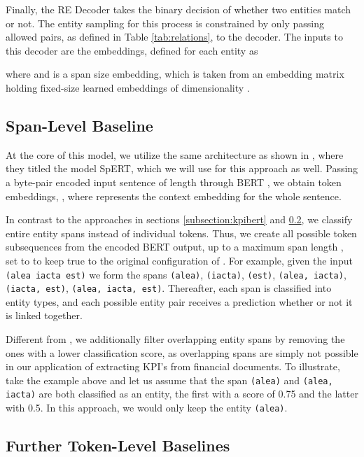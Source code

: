 \documentclass[conference, table]{IEEEtran}
\newcommand{\1} {\mathbbm{1}}
\begin{document}
Finally, the RE Decoder takes the binary decision of whether two entities match or not. The entity sampling for this process is constrained by only passing allowed pairs, as defined in Table \ref{tab:relations}, to the decoder. The inputs to this decoder are the embeddings, defined for each entity  as

where  and  is a span size embedding, which is taken from an embedding matrix  holding fixed-size learned embeddings of dimensionality .

\subsection{Span-Level Baseline}
\label{subsection:spert}

At the core of this model, we utilize the same architecture as shown in \cite{eberts2019span}, where they titled the model SpERT, which we will use for this approach as well. Passing a byte-pair encoded input sentence of length  through BERT \cite{devlin2018bert}, we obtain  token embeddings, , where  represents the context embedding for the whole sentence. 

In contrast to the approaches in sections \ref{subsection:kpibert} and \ref{subsection:furtherbaselines}, we classify entire entity spans instead of individual tokens. Thus, we create all possible token subsequences from the encoded BERT output, up to a maximum span length , set to  to keep true to the original configuration of \cite{eberts2019span}. For example, given the input \texttt{(alea iacta est)} we form the spans \texttt{(alea)}, \texttt{(iacta)}, \texttt{(est)}, \texttt{(alea, iacta)}, \texttt{(iacta, est)}, \texttt{(alea, iacta, est)}. Thereafter, each span is classified into entity types, and each possible entity pair receives a prediction whether or not it is linked together. 

Different from \cite{eberts2019span}, we additionally filter overlapping entity spans by removing the ones with a lower classification score, as overlapping spans are simply not possible in our application of extracting KPI's from financial documents. To illustrate, take the example above and let us assume that the span \texttt{(alea)} and \texttt{(alea, iacta)} are both classified as an entity, the first with a score of 0.75 and the latter with 0.5. In this approach, we would only keep the entity \texttt{(alea)}.

\subsection{Further Token-Level Baselines}
\label{subsection:furtherbaselines}
\end{document}
